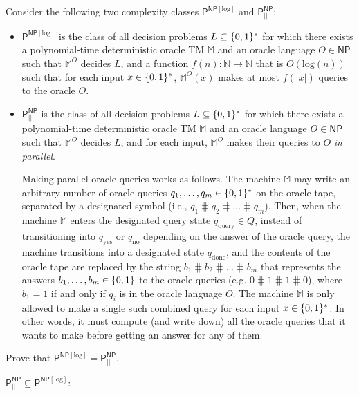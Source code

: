     \begin{question}
        Consider the following two complexity classes $\mathsf{P}^{\mathsf{NP}[\text{log}]}$ and $\mathsf{P}_{||}^{\mathsf{NP}}$:

        \begin{itemize}
            \item $\mathsf{P}^{\mathsf{NP}[\text{log}]}$ is the class of all decision problems $L \subseteq \{0, 1\}^*$ for which there exists a polynomial-time deterministic oracle TM $\mathbb{M}$ and an oracle language $O \in \mathsf{NP}$ such that $\mathbb{M}^O$ decides $L$, and a function $f(n): \mathbb{N} \to \mathbb{N}$ that is $O(\text{log}(n))$ such that for each input $x \in \{0, 1\}^*$, $\mathbb{M}^O(x)$ makes at most $f(|x|)$ queries to the oracle $O$.
            \item $\mathsf{P}_{||}^{\mathsf{NP}}$ is the class of all decision problems $L \subseteq \{0, 1\}^*$ for which there exists a polynomial-time deterministic oracle TM $\mathbb{M}$ and an oracle language $O \in \mathsf{NP}$ such that $\mathbb{M}^O$ decides $L$, and for each input, $\mathbb{M}^O$ makes their queries to $O$ \textit{in parallel}.

            Making parallel oracle queries works as follows. The machine $\mathbb{M}$ may write an arbitrary number of oracle queries $q_1, \ldots, q_m \in \{0, 1\}^*$ on the oracle tape, separated by a designated symbol \hash (i.e., $q_1\hash q_2 \hash \ldots \hash q_m$). Then, when the machine $\mathbb{M}$ enters the designated query state $q_{\text{query}} \in Q$, instead of transitioning into $q_{\text{yes}}$ or $q_{\text{no}}$ depending on the answer of the oracle query, the machine transitions into a designated state $q_{\text{done}}$, and the contents of the oracle tape are replaced by the string $b_1 \hash b_2 \hash \ldots \hash b_m$ that represents the answers $b_1, \ldots, b_m \in \{0,1\}$ to the oracle queries (e.g. $0 \hash 1 \hash 1 \hash 0$), where $b_1 = 1$ if and only if $q_i$ is in the oracle language $O$. The machine $\mathbb{M}$ is only allowed to make a single such combined query for each input $x \in \{0, 1\}^*$. In other words, it must compute (and write down) all the oracle queries that it wants to make before getting an answer for any of them.
    \end{itemize}

    Prove that $\mathsf{P}^{\mathsf{NP}[\text{log}]} = \mathsf{P}_{||}^{\mathsf{NP}}$.

    \begin{answer}
        $\mathsf{P}_{||}^{\mathsf{NP}} \subseteq \mathsf{P}^{\mathsf{NP}[\text{log}]}:$


\end{answer}
\end{question}
